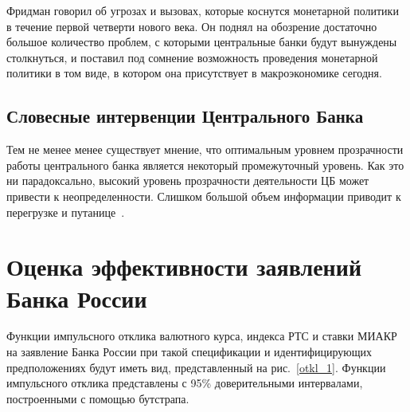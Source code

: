 \documentclass[12pt,a4paper, oneside]{extreport}
\begin{document}
Фридман говорил об угрозах и вызовах, которые коснутся монетарной политики в течение первой четверти нового века. Он поднял на обозрение достаточно большое количество проблем, с которыми  центральные банки будут вынуждены столкнуться, и поставил под сомнение возможность проведения монетарной политики в том виде, в котором она присутствует в макроэкономике сегодня.

\section{Словесные интервенции Центрального Банка}

Тем не менее менее существует мнение, что оптимальным уровнем прозрачности работы центрального банка является некоторый промежуточный уровень. Как это ни парадоксально, высокий уровень прозрачности деятельности ЦБ может привести к неопределенности.  Слишком большой объем информации приводит к перегрузке и путанице~\cite{morris2005central}.


\chapter{Оценка эффективности заявлений Банка России}

Функции импульсного отклика валютного курса, индекса РТС и ставки МИАКР на заявление Банка России при такой спецификации и идентифицирующих предположениях будут иметь вид, представленный на рис.~\ref{otkl_1}. Функции импульсного отклика представлены с 95\% доверительными интервалами, построенными с помощью бутстрапа.

\end{document}
